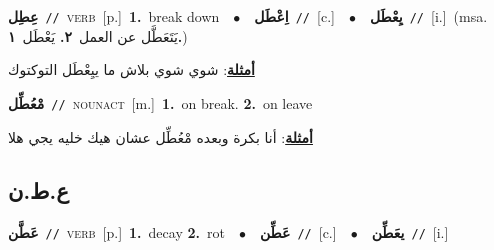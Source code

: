 \documentclass[10pt,a4paper,twoside]{article} %
\begin{document}
\begin{multicols}{2}
{\setlength\topsep{0pt}\textbf{\foreignlanguage{arabic}{عِطِل}}\ {\color{gray}\texttt{//}\color{black}}\ \textsc{verb}\ [p.]\ \textbf{1.}~break down\ \ $\bullet$\ \ \setlength\topsep{0pt}\textbf{\foreignlanguage{arabic}{اِعْطَل}}\ {\color{gray}\texttt{//}\color{black}}\ [c.]\ \ $\bullet$\ \ \setlength\topsep{0pt}\textbf{\foreignlanguage{arabic}{يِعْطَل}}\ {\color{gray}\texttt{//}\color{black}}\ [i.]\ \color{gray}(msa. \foreignlanguage{arabic}{يَتَعَطَّل عن العمل}~\foreignlanguage{arabic}{\textbf{٢.}}  \foreignlanguage{arabic}{يَعْطَل}~\foreignlanguage{arabic}{\textbf{١.}})\color{black}\  \begin{flushright}\color{gray}\foreignlanguage{arabic}{\textbf{\underline{\foreignlanguage{arabic}{أمثلة}}}: شوي شوي بلاش ما ييِعْطَل التوكتوك}\end{flushright}\color{black}} \vspace{2mm}

{\setlength\topsep{0pt}\textbf{\foreignlanguage{arabic}{مْعُطِّل}}\ {\color{gray}\texttt{//}\color{black}}\ \textsc{noun\textunderscore act}\ [m.]\ \textbf{1.}~on break.  \textbf{2.}~on leave\  \begin{flushright}\color{gray}\foreignlanguage{arabic}{\textbf{\underline{\foreignlanguage{arabic}{أمثلة}}}: أنا بكرة وبعده مْعُطِّل عشان هيك خليه يجي هلا}\end{flushright}\color{black}} \vspace{2mm}

\vspace{-3mm}
\subsection*{\color{blue}\foreignlanguage{arabic}{ع.ط.ن}\color{blue}{}} 

{\setlength\topsep{0pt}\textbf{\foreignlanguage{arabic}{عَطَّن}}\ {\color{gray}\texttt{//}\color{black}}\ \textsc{verb}\ [p.]\ \textbf{1.}~decay  \textbf{2.}~rot\ \ $\bullet$\ \ \setlength\topsep{0pt}\textbf{\foreignlanguage{arabic}{عَطِّن}}\ {\color{gray}\texttt{//}\color{black}}\ [c.]\ \ $\bullet$\ \ \setlength\topsep{0pt}\textbf{\foreignlanguage{arabic}{يعَطِّن}}\ {\color{gray}\texttt{//}\color{black}}\ [i.]\ } \vspace{2mm}


\end{multicols}
\end{document}
